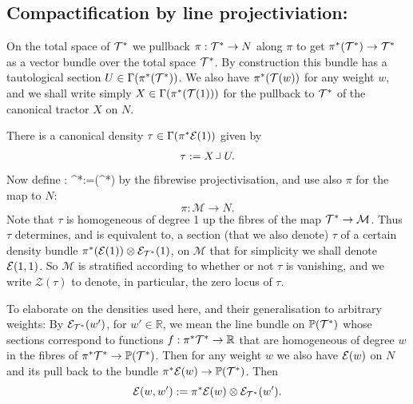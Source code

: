 \subsection{Compactification by line projectiviation:}
On the total space of $\mathcal{T}^*$ we pullback
$\pi:\mathcal{T}^*\to N$ along $\pi$ to get $\pi^*(\mathcal{T}^*)\to \mathcal{T}^*$ as a
vector bundle over the total space $\mathcal{T}^*$. By construction this
bundle has a tautological section $U\in \Gamma (\pi^*(\mathcal{T}^*))$.  We
also have $\pi^*(\mathcal{T}(w))$ for any weight $w$, and we
shall write simply $X\in \Gamma(\pi^*(\mathcal{T}(1)))$ for the pullback to
$\mathcal{T}^*$ of the canonical tractor $X$ on $N$.

There is  a canonical density $\tau\in \Gamma(\pi^*\mathcal{E}(1))$ given by
$$
\tau:= X\hook U .
$$


Now define
\be
\label{projection_map}
\kappa: \cT^*\longrightarrow {}:=(\cT^*)
\ee
by the fibrewise
projectivisation, and use also $\pi$ for the map to $N$:
$$
\pi:\mathcal{M}\to N.
$$ Note that $\tau$ is homogeneous of degree 1 up the fibres of the
map $\mathcal{T}^*\to \mathcal{M}$. Thus $\tau$ determines, and is equivalent
to, a section (that we also denote) $\tau$ of a certain density bundle
$\pi^*(\mathcal{E}(1))\otimes \mathcal{E}_{\mathcal{T}^*}(1)$, on $\mathcal{M}$ that for
simplicity we shall denote $\mathcal{E}(1,1)$.  So $\mathcal{M}$ is stratified according to
whether or not $\tau$ is vanishing, and we write $\mathcal{Z}(\tau)$
to denote, in particular, the zero locus of $\tau$.

To elaborate
on the densities used here, and their generalisation to arbitrary
weights: By $\mathcal{E}_{\mathcal{T}^*}(w')$, for $w'\in \mathbb{R}$, we mean the line
bundle on $\mathbb{P}(\mathcal{T}^*)$ whose sections correspond to functions
$f: \pi^*\mathcal{T}^* \to\mathbb{R} $ that are homogeneous of degree $w$ in
the fibres of $\pi^*\mathcal{T}^*\to \mathbb{P}(\mathcal{T}^*)$. Then for any weight $w$ we also have $\mathcal{E}(w)$ on $N$ and its pull back to the bundle $\pi^*\mathcal{E}(w)\to \mathbb{P}(\mathcal{T}^*)$.
Then
$$
\mathcal{E}(w,w'):= \pi^*\mathcal{E}(w) \otimes \mathcal{E}_{\mathcal{T}^*}(w').
$$


